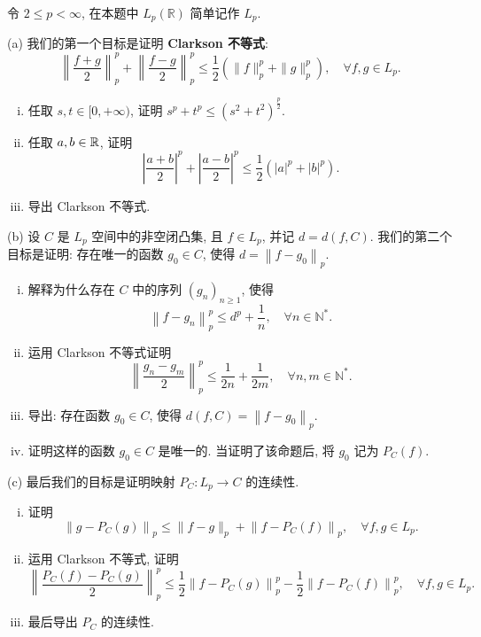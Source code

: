 \begin{exercise}
    令 $2 \leq p<\infty$, 在本题中 $L_{p}(\mathbb{R})$ 简单记作 $L_{p}$.

    (a) 我们的第一个目标是证明 \textbf{Clarkson 不等式}:
    \[
    \left\|\frac{f+g}{2}\right\|_{p}^{p}+\left\|\frac{f-g}{2}\right\|_{p}^{p} \leq \frac{1}{2}\left(\|f\|_{p}^{p}+\|g\|_{p}^{p}\right), \quad \forall f, g \in L_{p}.
    \]
    \begin{enumerate}[(i)]
        \item 任取 $s, t \in[0,+\infty)$, 证明 $s^{p}+t^{p} \leq\left(s^{2}+t^{2}\right)^{\frac{p}{2}}$.
        \item 任取 $a, b \in \mathbb{R}$, 证明
        \[
        \left|\frac{a+b}{2}\right|^{p}+\left|\frac{a-b}{2}\right|^{p} \leq \frac{1}{2}\left(|a|^{p}+|b|^{p}\right).
        \]
        \item 导出 Clarkson 不等式.
    \end{enumerate}

    (b) 设 $C$ 是 $L_{p}$ 空间中的非空闭凸集, 
    且 $f \in L_{p}$, 并记 $d=d(f, C)$. 我们的第二个目标是证明: 
    存在唯一的函数 $g_{0} \in C$, 使得 $d=\left\|f-g_{0}\right\|_{p}$.
    \begin{enumerate}[(i)]
        \item 解释为什么存在 $C$ 中的序列 $\left(g_{n}\right)_{n \geq 1}$, 使得
        \[
        \left\|f-g_{n}\right\|_{p}^{p} \leq d^{p}+\frac{1}{n}, \quad \forall n \in \mathbb{N}^{*}.
        \]
        \item 运用 Clarkson 不等式证明
        \[
        \left\|\frac{g_{n}-g_{m}}{2}\right\|_{p}^{p} \leq \frac{1}{2n}+\frac{1}{2m}, \quad \forall n, m \in \mathbb{N}^{*}.
        \]
        \item 导出: 存在函数 $g_{0} \in C$, 使得 $d(f, C)=\left\|f-g_{0}\right\|_{p}$.
        \item 证明这样的函数 $g_{0} \in C$ 是唯一的. 当证明了该命题后, 将 $g_{0}$ 记为 $P_{C}(f)$.
    \end{enumerate}

    (c) 最后我们的目标是证明映射 $P_{C}: L_{p} \rightarrow C$ 的连续性.
    \begin{enumerate}[(i)]
        \item 证明
        \[
        \left\|g-P_{C}(g)\right\|_{p} \leq\|f-g\|_{p}+\left\|f-P_{C}(f)\right\|_{p}, \quad \forall f, g \in L_{p}.
        \]
        \item 运用 Clarkson 不等式, 证明
        \[
        \left\|\frac{P_{C}(f)-P_{C}(g)}{2}\right\|_{p}^{p} \leq \frac{1}{2}\left\|f-P_{C}(g)\right\|_{p}^{p}-\frac{1}{2}\left\|f-P_{C}(f)\right\|_{p}^{p}, \quad \forall f, g \in L_{p}.
        \]
        \item 最后导出 $P_{C}$ 的连续性.
    \end{enumerate}
\end{exercise}

